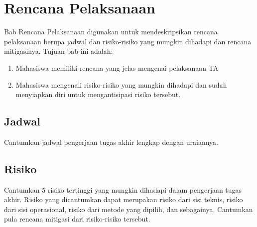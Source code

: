 \chapter{Rencana Pelaksanaan}
Bab Rencana Pelaksanaan digunakan untuk mendeskripsikan rencana pelaksanaan berupa jadwal dan risiko-risiko yang mungkin dihadapi dan rencana mitigasinya. Tujuan bab ini adalah:
\begin{enumerate}
\item Mahasiswa memiliki rencana yang jelas mengenai pelaksanaan TA

\item Mahasiswa mengenali risiko-risiko yang mungkin dihadapi dan sudah menyiapkan diri untuk mengantisipasi risiko tersebut.
\end{enumerate}

\section{Jadwal}
Cantumkan jadwal pengerjaan tugas akhir lengkap dengan uraiannya.

\section{Risiko}
Cantumkan 5 risiko tertinggi yang mungkin dihadapi dalam pengerjaan tugas akhir. Risiko yang dicantumkan dapat merupakan risiko dari sisi teknis, risiko dari sisi operasional, risiko dari metode yang dipilih, dan sebagainya. Cantumkan pula rencana mitigasi dari risiko-risiko tersebut.